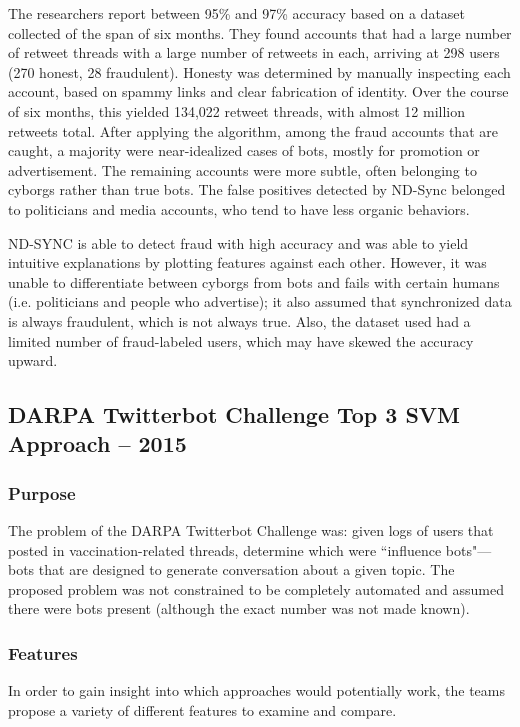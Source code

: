 \documentclass[11pt, oneside]{article}   	%
\begin{document}
\quad The researchers report between 95\% and 97\% accuracy based on a dataset collected of the span of six months.
They found accounts that had a large number of retweet threads with a large number of retweets in each, arriving at 298 users (270 honest, 28 fraudulent).
Honesty was determined by manually inspecting each account, based on spammy links and clear fabrication of identity.
Over the course of six months, this yielded 134,022 retweet threads, with almost 12 million retweets total.
After applying the algorithm, among the fraud accounts that are caught, a majority were near-idealized cases of bots, mostly for promotion or advertisement.
The remaining accounts were more subtle, often belonging to cyborgs rather than true bots.
The false positives detected by ND-Sync belonged to politicians and media accounts, who tend to have less organic behaviors.

\quad ND-SYNC is able to detect fraud with high accuracy and was able to yield intuitive explanations by plotting features against each other.
However, it was unable to differentiate between cyborgs from bots and fails with certain humans (i.e. politicians and people who advertise); it also assumed that synchronized data is always fraudulent, which is not always true.
Also, the dataset used had a limited number of fraud-labeled users, which may have skewed the accuracy upward.

\subsection*{DARPA Twitterbot Challenge Top 3 SVM Approach -- 2015}

\subsubsection*{Purpose}

\quad The problem of the DARPA Twitterbot Challenge was: given logs of users that posted in vaccination-related threads, determine which were ``influence bots"---bots that are designed to generate conversation about a given topic.
The proposed problem was not constrained to be completely automated and assumed there were bots present (although the exact number was not made known).

\subsubsection*{Features}

\quad In order to gain insight into which approaches would potentially work, the teams propose a variety of different features to examine and compare.
\end{document}
